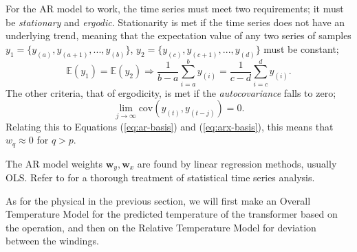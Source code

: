 \documentclass[]{article}
\begin{document}
For the AR model to work, the time series must meet two requirements; it must be \textit{stationary} and \textit{ergodic}. Stationarity is met if the time series does not have an underlying trend, meaning that the expectation value of any two series of samples $y_1 = \{y_{(a)}, y_{(a+1)}, ..., y_{(b)}\}$, $y_2 = \{y_{(c)}, y_{(c+1)}, ..., y_{(d)}\}$ must be constant;
\begin{equation}
	\mathbb{E}(y_1) = \mathbb{E}(y_2) \Rightarrow \frac{1}{b-a} \sum_{i=a}^{b} y_{(i)} = \frac{1}{c-d} \sum_{i=c}^{d} y_{(i)}.
\end{equation}
The other criteria, that of ergodicity, is met if the \textit{autocovariance} falls to zero;
\begin{equation}
	\lim\limits_{j \rightarrow \infty} \mathrm{cov}(y_{(t)}, y_{(t-j)}) = 0.
\end{equation}
Relating this to Equations (\ref{eq:ar-basis}) and (\ref{eq:arx-basis}), this means that $w_q \approx 0$ for $q > p$. 

The AR model weights $\mathbf{w}_y, \mathbf{w}_x$ are found by linear regression methods, usually OLS. Refer to \cite{shumway2017} for a thorough treatment of statistical time series analysis.

As for the physical in the previous section, we will first make an Overall Temperature Model for the predicted temperature of the transformer based on the operation, and then on the Relative Temperature Model for deviation between the windings.
\end{document}
